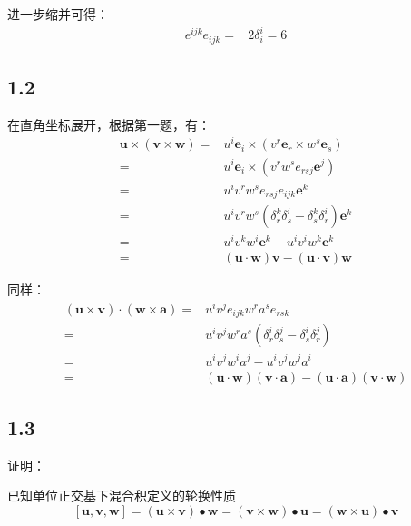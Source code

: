 \documentclass[UTF8,zihao=5]{ctexart}
\newcommand{\bm}[1]{{\mathbf{#1}}}
\begin{document}
进一步缩并可得：
\begin{equation*}
    \begin{aligned}
        e^{ijk}e_{ijk}
    =&2\delta^i_i
    =6
    \end{aligned}
\end{equation*}

\subsection*{1.2}
在直角坐标展开，根据第一题，有：
\begin{equation*}
    \begin{aligned}
        \bm{u}\times(\bm{v}\times\bm{w})
        =&
        u^i\bm{e}_i\times(v^r\bm{e}_r\times w^s\bm{e}_s)\\
        =&
        u^i\bm{e}_i\times(v^r w^s e_{rsj}\bm{e}^j)\\
        =&
        u^i v^r w^s e_{rsj}e_{ijk}\bm{e}^k\\
        =&
        u^i v^r w^s (\delta^k_r\delta^i_s-\delta^k_s\delta^i_r)
        \bm{e}^k\\
        =&
        u^i v^k w^i \bm{e}^k- u^i v^i w^k\bm{e}^k\\
        =&
        (\bm{u}\cdot\bm{w})\bm{v}-(\bm{u}\cdot\bm{v})\bm{w}
    \end{aligned}
\end{equation*}

同样：
\begin{equation*}
    \begin{aligned}
        (\bm{u}\times\bm{v})\cdot(\bm{w}\times\bm{a})
        =&
        u^iv^je_{ijk}w^ra^se_{rsk}\\
        =&
        u^iv^jw^ra^s(\delta^i_r\delta^j_s -
        \delta^i_s\delta^j_r)\\
        =&
        u^iv^jw^ia^j-u^iv^jw^ja^i\\
        =&
        (\bm{u}\cdot\bm{w})(\bm{v}\cdot\bm{a})-
        (\bm{u}\cdot\bm{a})(\bm{v}\cdot\bm{w})
    \end{aligned}
\end{equation*}

\subsection*{1.3}
证明：

已知单位正交基下混合积定义的轮换性质
$$
[\bm{u},\bm{v},\bm{w}]=
(\bm{u}\times\bm{v})\bullet\bm{w}
=(\bm{v}\times\bm{w})\bullet\bm{u}
=(\bm{w}\times\bm{u})\bullet\bm{v}
$$
\end{document}
